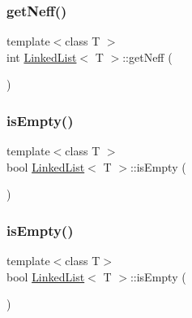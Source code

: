 \mbox{\label{classLinkedList_a0f1bf5709295784ae18271b88af50f88}} 
\subsubsection{\texorpdfstring{getNeff()}{getNeff()}\hspace{0.1cm}{\footnotesize\ttfamily [2/2]}}
{\footnotesize\ttfamily template$<$class T $>$ \\
int \mbox{\hyperlink{classLinkedList}{Linked\+List}}$<$ T $>$\+::get\+Neff (\begin{DoxyParamCaption}{ }\end{DoxyParamCaption})}

\mbox{\label{classLinkedList_a7ecbb28e82117a680839ed0dc28ebdce}} 
\subsubsection{\texorpdfstring{isEmpty()}{isEmpty()}\hspace{0.1cm}{\footnotesize\ttfamily [1/2]}}
{\footnotesize\ttfamily template$<$class T $>$ \\
bool \mbox{\hyperlink{classLinkedList}{Linked\+List}}$<$ T $>$\+::is\+Empty (\begin{DoxyParamCaption}{ }\end{DoxyParamCaption})}

\mbox{\label{classLinkedList_a7ecbb28e82117a680839ed0dc28ebdce}} 
\subsubsection{\texorpdfstring{isEmpty()}{isEmpty()}\hspace{0.1cm}{\footnotesize\ttfamily [2/2]}}
{\footnotesize\ttfamily template$<$class T$>$ \\
bool \mbox{\hyperlink{classLinkedList}{Linked\+List}}$<$ T $>$\+::is\+Empty (\begin{DoxyParamCaption}{ }\end{DoxyParamCaption})}

